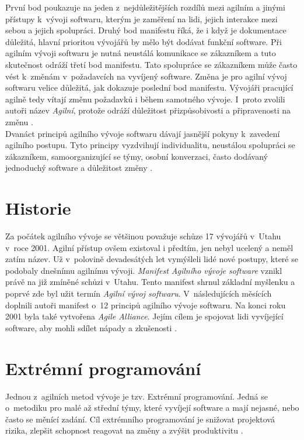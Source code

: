 \documentclass[12pt]{report}
\begin{document}
První bod poukazuje na jeden z~nejdůležitějších rozdílů mezi agilním a jinými přístupy k~vývoji softwaru, kterým je zaměření na lidi, jejich interakce mezi sebou a jejich spolupráci. Druhý bod manifestu říká, že i když je dokumentace důležitá, hlavní prioritou vývojářů by mělo být dodávat funkční software. Při agilním vývoji softwaru je nutná neustálá komunikace se zákazníkem a tuto skutečnost odráží třetí bod manifestu. Tato spolupráce se zákazníkem může často vést k~změnám v~požadavcích na vyvíjený software. Změna je pro agilní vývoj softwaru velice důležitá, jak dokazuje poslední bod manifestu. Vývojáři pracující agilně tedy vítají změnu požadavků i během samotného vývoje. I~proto zvolili autoři název \textit{Agilní}, protože odráží důležitost přizpůsobivosti a připravenosti na změnu \cite{AgileAlliance2025}.\\

Dvanáct principů agilního vývoje softwaru dávají jasnější pokyny k~zavedení agilního postupu. Tyto principy vyzdvihují individualitu, neustálou spolupráci se zákazníkem, samoorganizující se týmy, osobní konverzaci, často dodávaný jednoduchý software a důležitost změny \cite{Beck2001a}.

		\section{Historie}
		
		Za počátek agilního vývoje se většinou považuje schůze 17 vývojářů v~Utahu v~roce 2001. Agilní přístup ovšem existoval i předtím, jen nebyl ucelený a neměl zatím název. Už v~polovině devadesátých let vymýšleli lidé nové postupy, které se podobaly dnešnímu agilnímu vývoji. \textit{Manifest Agilního vývoje software} vznikl právě na již zmíněné schůzi v~Utahu. Tento manifest shrnul základní myšlenku a poprvé zde byl užit termín \textit{Agilní vývoj softwaru}. V~následujících měsících doplnili autoři manifest o~12 principů agilního vývoje softwaru. Na konci roku 2001 byla také vytvořena\textit{ Agile Alliance}. Jejím cílem je spojovat lidi vyvíjející software, aby mohli sdílet nápady a zkušenosti \cite{AgileAlliance2025a}.
		
		\section{Extrémní programování}
		
		Jednou z~agilních metod vývoje je tzv. Extrémní programování. Jedná se o~metodiku pro malé až střední týmy, které vyvíjejí software a mají nejasné, nebo často se měnící zadání. Cíl extrémního programování je snižovat projektová rizika, zlepšit schopnost reagovat na změny a zvýšit produktivitu \cite{Beck2002}. \\
		
\end{document}
